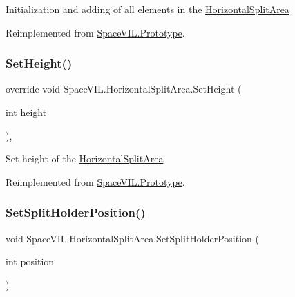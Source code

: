 Initialization and adding of all elements in the \mbox{\hyperlink{class_space_v_i_l_1_1_horizontal_split_area}{Horizontal\+Split\+Area}} 



Reimplemented from \mbox{\hyperlink{class_space_v_i_l_1_1_prototype_ac3379fe02923ee155b5b0084abf27420}{Space\+V\+I\+L.\+Prototype}}.

\mbox{\label{class_space_v_i_l_1_1_horizontal_split_area_ab018f220de9d5f76f52d3068925d1bdf}} 
\subsubsection{\texorpdfstring{Set\+Height()}{SetHeight()}}
{\footnotesize\ttfamily override void Space\+V\+I\+L.\+Horizontal\+Split\+Area.\+Set\+Height (\begin{DoxyParamCaption}\item[{int}]{height }\end{DoxyParamCaption})\hspace{0.3cm}{\ttfamily [inline]}, {\ttfamily [virtual]}}



Set height of the \mbox{\hyperlink{class_space_v_i_l_1_1_horizontal_split_area}{Horizontal\+Split\+Area}} 



Reimplemented from \mbox{\hyperlink{class_space_v_i_l_1_1_prototype_adc0adcbd1c3800d9525798ba7be5832a}{Space\+V\+I\+L.\+Prototype}}.

\mbox{\label{class_space_v_i_l_1_1_horizontal_split_area_a0e39ace0e53c5ec509c7b40168b025ae}} 
\subsubsection{\texorpdfstring{Set\+Split\+Holder\+Position()}{SetSplitHolderPosition()}}
{\footnotesize\ttfamily void Space\+V\+I\+L.\+Horizontal\+Split\+Area.\+Set\+Split\+Holder\+Position (\begin{DoxyParamCaption}\item[{int}]{position }\end{DoxyParamCaption})\hspace{0.3cm}{\ttfamily [inline]}}



